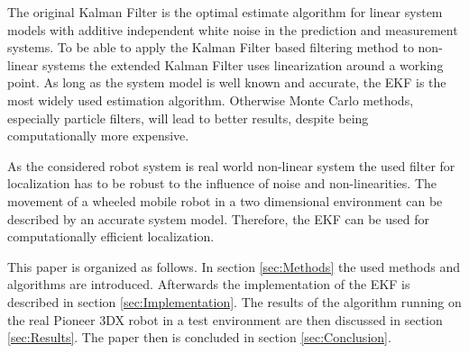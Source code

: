 The original Kalman Filter is the optimal estimate algorithm for linear system models with additive independent white noise in the prediction and measurement systems. To be able to apply the Kalman Filter based filtering method to non-linear systems the extended Kalman Filter uses linearization around a working point. As long as the system model is well known and accurate, the EKF is the most widely used estimation algorithm. Otherwise Monte Carlo methods, especially particle filters, will lead to better results, despite being computationally more expensive. \cite{JulierUhlmann}

As the considered robot system is real world non-linear system the used filter for localization has to be robust to the influence of noise and non-linearities. The movement of a wheeled mobile robot in a two dimensional environment can be described by an accurate system model. Therefore, the EKF  can be used for computationally efficient localization.

This paper is organized as follows. In section \ref{sec:Methods} the used methods and algorithms are introduced. Afterwards the implementation of the EKF is described in section \ref{sec:Implementation}. The results of the algorithm running on the real Pioneer 3DX robot in a test environment are then discussed in section \ref{sec:Results}. The paper then is concluded in section \ref{sec:Conclusion}.